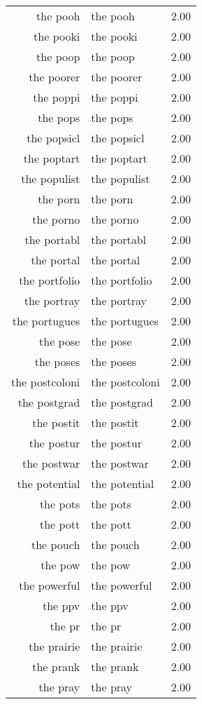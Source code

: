 \begin{table}[ht]
\begin{tabular}{rlr}
  the pooh & the pooh & 2.00 \\ 
  the pooki & the pooki & 2.00 \\ 
  the poop & the poop & 2.00 \\ 
  the poorer & the poorer & 2.00 \\ 
  the poppi & the poppi & 2.00 \\ 
  the pops & the pops & 2.00 \\ 
  the popsicl & the popsicl & 2.00 \\ 
  the poptart & the poptart & 2.00 \\ 
  the populist & the populist & 2.00 \\ 
  the porn & the porn & 2.00 \\ 
  the porno & the porno & 2.00 \\ 
  the portabl & the portabl & 2.00 \\ 
  the portal & the portal & 2.00 \\ 
  the portfolio & the portfolio & 2.00 \\ 
  the portray & the portray & 2.00 \\ 
  the portugues & the portugues & 2.00 \\ 
  the pose & the pose & 2.00 \\ 
  the poses & the poses & 2.00 \\ 
  the postcoloni & the postcoloni & 2.00 \\ 
  the postgrad & the postgrad & 2.00 \\ 
  the postit & the postit & 2.00 \\ 
  the postur & the postur & 2.00 \\ 
  the postwar & the postwar & 2.00 \\ 
  the potential & the potential & 2.00 \\ 
  the pots & the pots & 2.00 \\ 
  the pott & the pott & 2.00 \\ 
  the pouch & the pouch & 2.00 \\ 
  the pow & the pow & 2.00 \\ 
  the powerful & the powerful & 2.00 \\ 
  the ppv & the ppv & 2.00 \\ 
  the pr & the pr & 2.00 \\ 
  the prairie & the prairie & 2.00 \\ 
  the prank & the prank & 2.00 \\ 
  the pray & the pray & 2.00 \\ 

\end{tabular}
\end{table}
